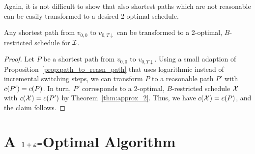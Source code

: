 Again, it is not difficult to show that also shortest paths which are not reasonable can be easily transformed to a desired 2-optimal schedule.
\begin{cor}\label{cor:opt_sched_short_path_pseudo_lin}
Any shortest path from $v_{0,0}$ to $v_{0,T\downarrow}$ can be transformed to a 2-optimal, $B$-restricted schedule for $\mathcal{I}$.
\end{cor}
\begin{proof}
Let $P$ be a shortest path from $v_{0,0}$ to $v_{0,T\downarrow}$. Using a small adaption of Proposition~\ref{prop:path_to_reasn_path} that uses logarithmic instead of incremental switching steps, we can transform $P$ to a reasonable path $P'$ with $c(P')=c(P)$.
In turn, $P'$ corresponds to a 2-optimal, $B$-restricted schedule $\mathcal{X}$ with $c(\mathcal{X})=c(P')$ by Theorem~\ref{thm:approx_2}. Thus, we have $c(\mathcal{X})=c(P)$, and the claim follows.
\end{proof}


\section{A $1+\boldsymbol\varepsilon$-Optimal Algorithm}
